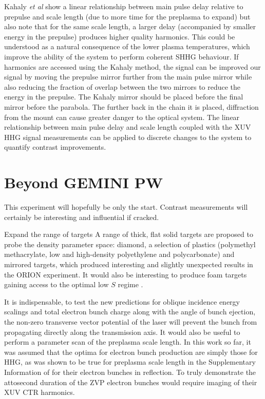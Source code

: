 Kahaly \textit{et al} show a linear relationship between main pulse delay relative to prepulse and scale length (due to more time for the preplasma to expand) but also note that for the same scale length, a larger delay (accompanied by smaller energy in the prepulse) produces higher quality harmonics. This could be understood as a natural consequence of the lower plasma temperatures, which improve the ability of the system to perform coherent SHHG behaviour. If harmonics are accessed using the Kahaly method, the signal can be improved our signal by moving the prepulse mirror further from the main pulse mirror while also reducing the fraction of overlap between the two mirrors to reduce the energy in the prepulse. The Kahaly mirror should be placed before the final mirror before the parabola. The further back in the chain it is placed, diffraction from the mount can cause greater danger to the optical system. The linear relationship between main pulse delay and scale length coupled with the XUV HHG signal measurements can be applied to discrete changes to the system to quantify contrast improvements.

\section{Beyond GEMINI PW}\label{sec:ch4-beyond}
This experiment will hopefully be only the start. Contrast measurements will certainly be interesting and influential if cracked.

Expand the range of targets A range of thick, flat solid targets are proposed to probe the density parameter space: diamond, a selection of plastics (polymethyl methacrylate, low and high-density polyethylene and polycarbonate) and mirrored targets, which produced interesting and slightly unexpected results in the ORION experiment. It would also be interesting to produce foam targets gaining access to the optimal low $S$ regime \cite{bataniPhysicsIssuesShock2014}.

It is indispensable, to test the new predictions for oblique incidence energy scalings and total electron bunch charge along with the angle of bunch ejection, the non-zero transverse vector potential of the laser will prevent the bunch from propagating directly along the transmission axis. It would also be useful to perform a parameter scan of the preplasma scale length. In this work so far, it was assumed that the optima for electron bunch production are simply those for \ac{HHG}, as was shown to be true for preplasma scale length in the Supplementary Information of \cite{thevenetVacuumLaserAcceleration2016} for their electron bunches in reflection. To truly demonstrate the attosecond duration of the ZVP electron bunches would require imaging of their XUV CTR harmonics.

